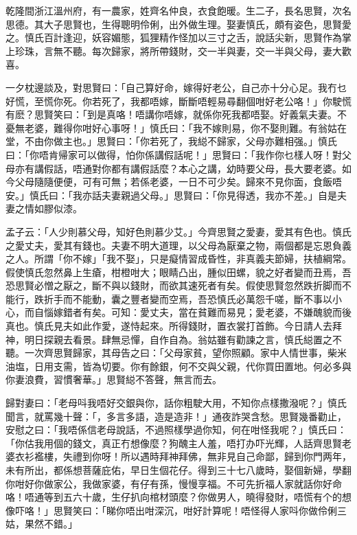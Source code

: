 \documentclass[a5paper, 12pt, openany]{book} %
\begin{document}
	乾隆間浙江溫州府，有一農家，姓齊名仲良，衣食飽暖。生二子，長名思賢，次名思德。其大子思賢也，生得聰明伶俐，出外做生理。娶妻慎氏，頗有姿色，思賢愛之。慎氏百計逢迎，妖容媚態，狐狸精作怪加以三寸之舌，說話尖新，思賢作為掌上珍珠，言無不聽。每次歸家，將所帶錢財，交一半與妻，交一半與父母，妻大歡喜。

	一夕枕邊談及，對思賢曰：「自己算好命，嫁得好老公，自己亦十分心足。我冇乜好慌，至慌你死。你若死了，我都唔嫁，斷斷唔輕易尋翻個咁好老公咯！」你駛慌有麽？思賢笑曰：「到是真咯！唔講你唔嫁，就係你死我都唔娶。好義氣夫妻。不憂無老婆，難得你咁好心事呀！」慎氏曰：「我不嫁則易，你不娶則難。有翁姑在堂，不由你做主也。」思賢曰：「你若死了，我縂不歸家，父母亦難相强。」慎氏曰：「你唔肯帰家可以做得，怕你係講假話呢！」思賢曰：「我作你乜樣人呀！對父母亦有講假話，唔通對你都有講假話麼？本心之講，幼時要父母，長大要老婆。如今父母隨隨便便，可有可無；若係老婆，一日不可少矣。歸來不見你面，食飯唔安。」慎氏曰：「我亦話夫妻親過父母。」思賢曰：「你見得透，我亦不差。」自是夫妻之情如膠似漆。

	孟子云：「人少則慕父母，知好色則慕少艾。」今齊思賢之愛妻，愛其有色也。慎氏之愛丈夫，愛其有錢也。夫妻不明大道理，以父母為厭棄之物，兩個都是忘恩負義之人。所謂「你不嫁」「我不娶」，只是癡情習成昏性，非真義夫節婦，扶植綱常。假使慎氏忽然鼻上生瘡，柑橙咁大；眼睛凸出，腫似田螺，貌之好者變而丑焉，吾恐思賢必憎之厭之，斷不與以錢財，而欲其速死者有矣。假使思賢忽然跌折脚而不能行，跌折手而不能動，囊之豐者變而空焉，吾恐慎氏必萬怨千嗟，斷不事以小心，而自惱嫁錯者有矣。可知：愛丈夫，當在貧難而易見；愛老婆，不嫌醜貌而後真也。慎氏見夫如此作愛，遂恃起來。所得錢財，置衣裳打首飾。今日請人去拜神，明日探親去看景。肆無忌憚，自作自為。翁姑雖有勸諫之言，慎氏縂置之不聽。一次齊思賢歸家，其母告之曰：「父母家貧，望你照顧。家中人情世事，柴米油塩，日用支需，皆為切要。你有餘銀，何不交與父親，代你買田置地。何必多與你妻浪費，習慣奢華。」思賢縂不答聲，無言而去。

	歸對妻曰：「老母呌我唔好交銀與你，話你粗駛大用，不知你点樣撒潑呢？」慎氏聞言，就罵幾十聲：「，多言多語，造是造非！」通夜詐哭含愁。思賢幾番勸止，安慰之曰：「我唔係信老母說話，不過照樣學過你知，何在咁怪我呢？」慎氏曰：「你估我用個的錢文，真正冇想像麼？狗醜主人羞，唔打办吓光輝，人話齊思賢老婆衣衫襤樓，失禮到你呀！所以遇時拜神拜佛，無非見自己命鄙，歸到你門两年，未有所出，都係想菩薩庇佑，早日生個花仔。得到三十七八歲時，娶個新婦，學翻你咁好你做家公，我做家婆，有仔有孫，慢慢享福。不可先折福人家就話你好命咯！唔通等到五六十歲，生仔扒向棺材頭麼？你做男人，曉得發財，唔慌有个的想像吓咯！」思賢笑曰：「睇你唔出咁深沉，咁好計算呢！唔怪得人家呌你做伶俐三姑，果然不錯。」
\end{document}

